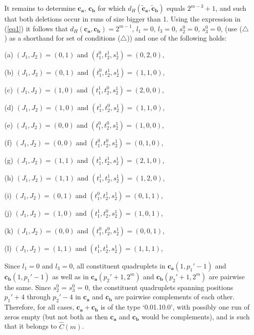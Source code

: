 It remains to determine $\mathbf{c_a}$, $\mathbf{c_b}$ for which
$d_H(\mathbf{\tilde{c}_a}, \mathbf{\tilde{c}_b})$ equals
$2^{m-3}+1$, and such that both deletions occur in runs of size
bigger than 1. Using the expression in (\ref{eq1}) it follows that
$d_H(\mathbf{c_a}, \mathbf{c_b}) = 2^{m-1}$, $l_1 = 0$, $l_3 =0$,
$s_{2}^0 = 0$, $s_{3}^0 = 0$, (use ($\triangle$) as a shorthand
for set of conditions ($\triangle$)) and one of the following
holds:

(a) $(J_1, J_2) = (0, 1)$ and $(t_{1}^0, t_{2}^1, s_2^1) = (0, 2,
0)$,

(b) $(J_1, J_2) = (0, 1)$ and $(t_{1}^0, t_{2}^1, s_2^1) = (1, 1,
0)$,

(c) $(J_1, J_2) = (1, 0)$ and $(t_{1}^1, t_{2}^0, s_2^1) = (2, 0,
0)$,

(d) $(J_1, J_2) = (1, 0)$ and $(t_{1}^1, t_{2}^0, s_2^1) = (1, 1,
0)$,

(e) $(J_1, J_2) = (0, 0)$ and $(t_{1}^0, t_{2}^0, s_2^1) = (1, 0,
0)$,

(f) $(J_1, J_2) = (0, 0)$ and $(t_{1}^0, t_{2}^0, s_2^1) = (0, 1,
0)$,

(g) $(J_1, J_2) = (1, 1)$ and $(t_{1}^1, t_{2}^1, s_2^1) = (2, 1,
0)$,

(h) $(J_1, J_2) = (1, 1)$ and $(t_{1}^1, t_{2}^1, s_2^1) = (1, 2,
0)$,

(i) $(J_1, J_2) = (0, 1)$ and $(t_{1}^0, t_{2}^1, s_2^1) = (0, 1,
1)$,

(j) $(J_1, J_2) = (1, 0)$ and $(t_{1}^1, t_{2}^0, s_2^1) = (1, 0,
1)$,

(k) $(J_1, J_2) = (0, 0)$ and $(t_{1}^0, t_{2}^0, s_2^1) = (0, 0,
1)$,

(l) $(J_1, J_2) = (1, 1)$ and $(t_{1}^1, t_{2}^1, s_2^1) = (1, 1,
1)$,

Since $l_1=0$ and $l_3=0$, all constituent quadruplets in
$\mathbf{c_a}(1,p_1'-1)$ and $\mathbf{c_b}(1,p_1'-1)$ as well as
in $\mathbf{c_a}(p_2'+1,2^m)$ and $\mathbf{c_b}(p_2'+1,2^m)$ are
pairwise the same. Since $s_{2}^0$ = $s_{3}^0$ = $0$, the
constituent quadruplets spanning positions $p_1'+4$ through
$p_2'-4$ in $\mathbf{c_a}$ and $\mathbf{c_b}$ are pairwise
complements of each other. Therefore, for all cases,
$\mathbf{c_a}+\mathbf{c_b}$ is of the type `0.01.10.0', with
possibly one run of zeros empty (but not both as then
$\mathbf{c_a}$ and $\mathbf{c_b}$ would be complements), and is
such that it belongs to $\hat{C}(m)$.

